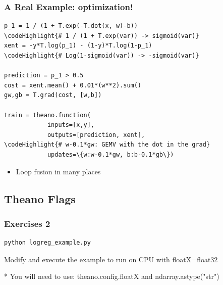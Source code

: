 \documentclass[a4paper,9pt]{beamer}
\begin{document}
\begin{frame}[fragile]
  \frametitle{A Real Example: optimization!}
\begin{Verbatim}[commandchars=\\\{\}]
p_1 = 1 / (1 + T.exp(-T.dot(x, w)-b))
\codeHighlight{# 1 / (1 + T.exp(var)) -> sigmoid(var)}
xent = -y*T.log(p_1) - (1-y)*T.log(1-p_1)
\codeHighlight{# Log(1-sigmoid(var)) -> -sigmoid(var)}

prediction = p_1 > 0.5
cost = xent.mean() + 0.01*(w**2).sum()
gw,gb = T.grad(cost, [w,b])

train = theano.function(
            inputs=[x,y],
            outputs=[prediction, xent],
\codeHighlight{# w-0.1*gw: GEMV with the dot in the grad}
            updates=\{w:w-0.1*gw, b:b-0.1*gb\})

\end{Verbatim}
\begin{itemize}
\item Loop fusion in many places
\end{itemize}
\end{frame}

\subsection{Theano Flags}

\begin{frame}[fragile]
\frametitle{Exercises 2}
\begin{Verbatim}
python logreg_example.py
\end{Verbatim}
\vfill
Modify and execute the example to run on CPU with floatX=float32

* You will need to use: theano.config.floatX and ndarray.astype("str")
\end{frame}
\end{document}
